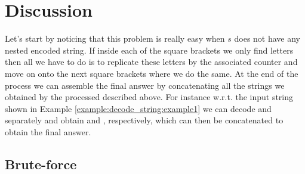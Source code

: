 \section{Discussion}
\label{decode_string:sec:discussion}
Let's start by noticing that this problem is really easy when
$s$ does not have any nested encoded string. If inside each of the square brackets we only find letters
then all we have to do is to replicate these letters by the associated counter and move on onto the next square brackets where we do the same. 
At the end of the process we can assemble the final answer by concatenating all the strings we obtained by the processed described above.
For instance w.r.t. the input string shown in Example \ref{example:decode_string:example1} we can decode 
 and  separately and obtain  and , respectively, which can then be concatenated to obtain the final answer.



\subsection{Brute-force}
\label{decode_string:sec:bruteforce}

\begin{minipage}{\linewidth}
	
\end{minipage}

